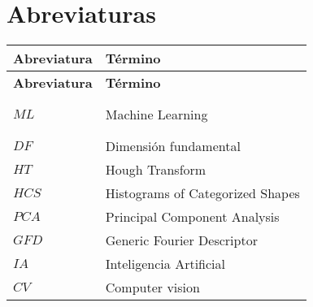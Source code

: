 \begin{comment}

\section*{Superíndices}
\begin{longtable}[l]{>{}l<{}l}
  \textbf{Superíndice} & \textbf{Término} \\[0.5ex] \hline%
  \endfirsthead%
  \textbf{Superíndice} & \textbf{Término} \\[0.5ex] \hline%
  \endhead%
\renewcommand{\arraystretch}{1.4}\label{simbolosg}

 n &Coeficiente x\\%



\end{longtable}


\setlength{\extrarowheight}{0pt}
\end{comment}

\section*{Abreviaturas}
\begin{longtable}[l]{>{}l<{}l}
  \textbf{Abreviatura} & \textbf{Término} \\[0.5ex] \hline%
  \endfirsthead%
  \textbf{Abreviatura} & \textbf{Término} \\[0.5ex] \hline%
  \endhead%
\renewcommand{\arraystretch}{1.4}
\label{abreviaturas}

$ML$	 &	Machine Learning	\\%
$DF$    &Dimensión fundamental				\\%
$HT$  &Hough Transform	\\%
$HCS$ &Histograms of Categorized Shapes	\\%
$PCA$ &Principal Component Analysis	\\%
$GFD$ &Generic Fourier Descriptor	\\%
$IA$  &Inteligencia Artificial	\\%
$CV$  &Computer vision	\\%
\end{longtable}

\listoffigures



\setlength{\extrarowheight}{0pt}